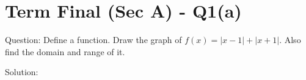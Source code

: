 \documentclass[11pt, a4paper]{article}
\begin{document}

\section*{Term Final (Sec A) - Q1(a)}

Question:
Define a function. Draw the graph of $f(x) = |x - 1| + |x + 1|$. Also find the domain and range of it.

Solution:
\end{document}
